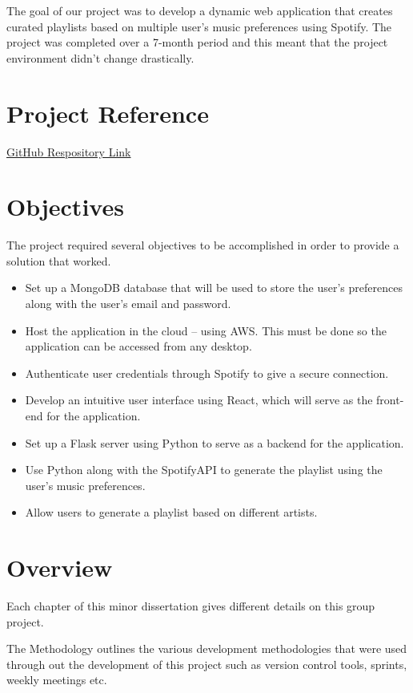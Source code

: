 The goal of our project was to develop a dynamic web application that creates curated playlists based on multiple user's music preferences using Spotify.
The project was completed over a 7-month period and this meant that the project environment didn’t change drastically.

\section{Project Reference}
\href{https://github.com/WePickOrganization/WePick}{GitHub Respository Link}

\section{Objectives}
The project required several objectives to be accomplished in order to provide a solution that worked.
\begin{itemize}
	\item Set up a MongoDB database that will be used to store the user’s preferences along with the user’s email and password.
	\item Host the application in the cloud – using AWS. This must be done so the application can be accessed from any desktop.
	\item Authenticate user credentials through Spotify to give a secure connection.
	\item Develop an intuitive user interface using React, which will serve as the front-end for the application.
	\item Set up a Flask server using Python to serve as a backend for the application.
	\item Use Python along with the SpotifyAPI to generate the playlist using the user’s music preferences.
	\item Allow users to generate a playlist based on different artists.
\end{itemize}

\section{Overview}
Each chapter of this minor dissertation gives different details on this group project.\newline

The Methodology outlines the various development methodologies that were used through out the development of this project such as version control tools, sprints, weekly meetings etc.\newline

